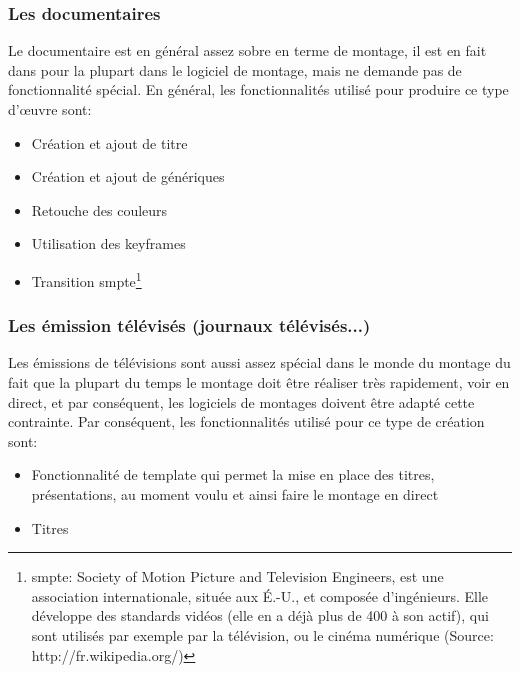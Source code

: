     \subsubsection {Les documentaires}
      Le documentaire est en général assez sobre en terme de montage, il est en
      fait dans pour la plupart dans le logiciel de montage, mais ne demande pas
      de fonctionnalité spécial. En général, les fonctionnalités utilisé
      pour produire ce type d'œuvre sont:
      \begin{itemize}
        \item{Création et ajout de titre}
        \item{Création et ajout de génériques}
        \item{Retouche des couleurs}
        \item{Utilisation des keyframes}
        \item{Transition smpte\footnote{smpte: Society of Motion Picture
          and Television Engineers, est une association internationale,
          située aux É.-U., et composée d'ingénieurs. Elle développe
          des standards vidéos (elle en a déjà plus de 400 à son actif),
          qui sont utilisés par exemple par la télévision, ou le cinéma numérique
          (Source: http://fr.wikipedia.org/)}}
      \end{itemize}

    \subsubsection {Les émission télévisés (journaux télévisés...)}
      Les émissions de télévisions sont aussi assez spécial dans le monde du montage
      du fait que la plupart du temps le montage doit être réaliser très rapidement,
      voir en direct, et par conséquent, les logiciels de montages doivent être
      adapté cette contrainte. Par conséquent, les fonctionnalités utilisé pour
      ce type de création sont:
      \begin{itemize}
        \item{Fonctionnalité de template qui permet la mise en place des titres,
              présentations, au moment voulu et ainsi faire le montage en direct}
        \item{Titres}
      \end{itemize}

